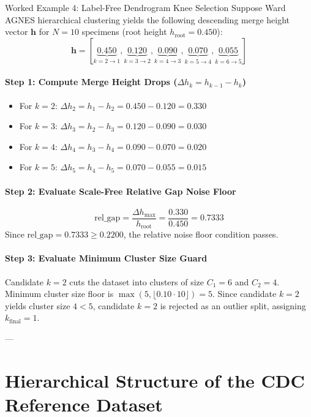 \documentclass[11pt,a4paper]{article}
\begin{document}
\begin{examplebox}{Worked Example 4: Label-Free Dendrogram Knee Selection}
Suppose Ward AGNES hierarchical clustering yields the following descending merge height vector $\mathbf{h}$ for $N=10$ specimens (root height $h_{\text{root}} = 0.450$):
$$\mathbf{h} = [\underbrace{0.450}_{k=2 \to 1}, \underbrace{0.120}_{k=3 \to 2}, \underbrace{0.090}_{k=4 \to 3}, \underbrace{0.070}_{k=5 \to 4}, \underbrace{0.055}_{k=6 \to 5}]$$

\paragraph{Step 1: Compute Merge Height Drops ($\Delta h_k = h_{k-1} - h_k$)}
\begin{itemize}
    \item For $k = 2$: $\Delta h_2 = h_1 - h_2 = 0.450 - 0.120 = \mathbf{0.330}$
    \item For $k = 3$: $\Delta h_3 = h_2 - h_3 = 0.120 - 0.090 = \mathbf{0.030}$
    \item For $k = 4$: $\Delta h_4 = h_3 - h_4 = 0.090 - 0.070 = \mathbf{0.020}$
    \item For $k = 5$: $\Delta h_5 = h_4 - h_5 = 0.070 - 0.055 = \mathbf{0.015}$
\end{itemize}

\paragraph{Step 2: Evaluate Scale-Free Relative Gap Noise Floor}
$$\text{rel\_gap} = \frac{\Delta h_{\text{max}}}{h_{\text{root}}} = \frac{0.330}{0.450} = \mathbf{0.7333}$$
Since $\text{rel\_gap} = 0.7333 \ge 0.2200$, the relative noise floor condition passes.

\paragraph{Step 3: Evaluate Minimum Cluster Size Guard}
Candidate $k=2$ cuts the dataset into clusters of size $C_1=6$ and $C_2=4$. Minimum cluster size floor is $\max(5, \lfloor 0.10 \cdot 10 \rfloor) = 5$. Since candidate $k=2$ yields cluster size $4 < 5$, candidate $k=2$ is rejected as an outlier split, assigning $k_{\text{final}} = 1$.
\end{examplebox}

---

\section{Hierarchical Structure of the CDC Reference Dataset}
\end{document}
